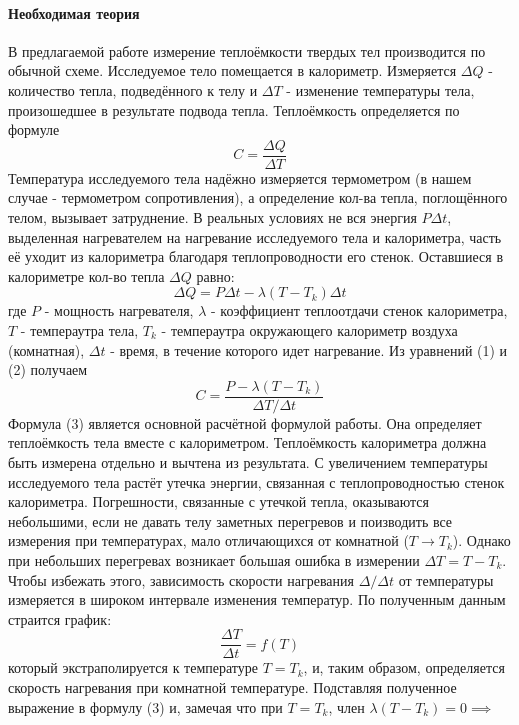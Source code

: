 \documentclass[a4paper]{article}
\begin{document}
	\paragraph{Необходимая теория}
	В предлагаемой работе измерение теплоёмкости твердых тел производится по обычной схеме. Исследуемое тело помещается в калориметр. Измеряется $\Delta Q$ - количество тепла, подведённого к телу и $\Delta T$ - изменение температуры тела, произошедшее в результате подвода тепла. Теплоёмкость определяется по формуле
	\begin{equation}
	C=\frac{\Delta Q}{\Delta T}
	\end{equation}
	Температура исследуемого тела надёжно измеряется термометром (в нашем случае - термометром сопротивления), а определение кол-ва тепла, поглощённого телом, вызывает затруднение. В реальных условиях не вся энергия $P\Delta t$, выделенная нагревателем на нагревание исследуемого тела и калориметра, часть её уходит из калориметра благодаря теплопроводности его стенок. Оставшиеся в калориметре кол-во тепла $\Delta Q$ равно:
	\begin{equation}
	\Delta Q = P\Delta t - \lambda(T-T_k) \Delta t
	\end{equation}
	где $P$ - мощность нагревателя, $\lambda$ - коэффициент теплоотдачи стенок калориметра, $T$ - темпераутра тела, $T_k$ - темпераутра окружающего калориметр воздуха (комнатная), $\Delta t$ - время, в течение которого идет нагревание. 
	Из уравнений (1) и (2) получаем
	\begin{equation}
	C=\frac{P - \lambda(T-T_k)}{\Delta T/\Delta t}
	\end{equation}
	Формула (3) является основной расчётной формулой работы. Она определяет теплоёмкость тела вместе с калориметром. Теплоёмкость калориметра должна быть измерена отдельно и вычтена из результата. С увеличением температуры исследуемого тела растёт утечка энергии, связанная с теплопроводностью стенок калориметра. Погрешности, связанные с утечкой тепла, оказываются небольшими, если не давать телу заметных перегревов и поизводить все измерения при температурах, мало отличающихся от комнатной ($T \rightarrow T_k$).
	Однако при небольших перегревах возникает большая ошибка в измерении $\Delta T = T - T_k$. Чтобы избежать этого, зависимость скорости нагревания $\Delta/\Delta t$ от температуры измеряется в широком интервале изменения температур. По полученным данным страится график:
	\begin{equation}
	\frac{\Delta T}{\Delta t} = f(T)
	\end{equation}
	который экстраполируется к температуре $T=T_k$, и, таким образом, определяется скорость нагревания при комнатной температуре. Подставляя полученное выражение в формулу (3) и, замечая что при $T=T_k$, член $\lambda (T-T_k)=0 \implies$
\end{document}
